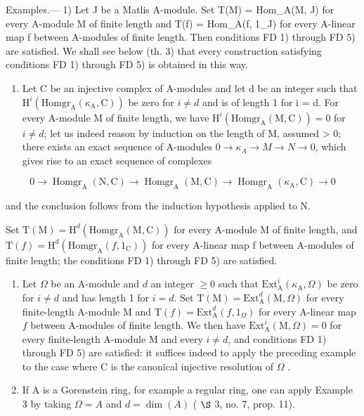 Examples.--- 1) Let J be a Matlis A-module. Set T(M) = Hom\_A(M, J) for every A-module M of finite length and T(f) = Hom\_A(f, 1\_J) for every A-linear map f between A-modules of finite length. Then conditions FD 1) through FD 5) are satisfied. We shall see below (th. 3) that every construction satisfying conditions FD 1) through FD 5) is obtained in this way.

\begin{enumerate}
\def\labelenumi{\arabic{enumi})}
\setcounter{enumi}{1}
\tightlist
\item
  Let C be an injective complex of A-modules and let d be an integer such that \(\mathrm{H}^{i}(\mathrm{Homgr}_{\mathrm{A}}(\kappa_{\mathrm{A}},\mathrm{C}))\) be zero for \(i \neq d\) and is of length 1 for i = d. For every A-module M of finite length, we have \(\mathrm{H}^{i}(\mathrm{Homgr}_{\mathrm{A}}(\mathrm{M},\mathrm{C})) = 0\) for \(i \neq d\); let us indeed reason by induction on the length of M, assumed \textgreater{} 0; there exists an exact sequence of A-modules \(0 \to \kappa_{A} \to M \to N \to 0\), which gives rise to an exact sequence of complexes
\end{enumerate}

\[
0 \rightarrow \operatorname{Homgr} _ {\mathrm{A}} (\mathrm{N}, \mathrm{C}) \longrightarrow \operatorname{Homgr} _ {\mathrm{A}} (\mathrm{M}, \mathrm{C}) \longrightarrow \operatorname{Homgr} _ {\mathrm{A}} (\kappa_ {\mathrm{A}}, \mathrm{C}) \longrightarrow 0
\]

and the conclusion follows from the induction hypothesis applied to N.

Set \(\mathrm{T}(\mathrm{M})=\mathrm{H}^{d}(\mathrm{Homgr}_{\mathrm{A}}(\mathrm{M},\mathrm{C}))\) for every A-module M of finite length, and \(\mathrm{T}(f)=\mathrm{H}^{d}(\mathrm{Homgr}_{\mathrm{A}}(f,1_{\mathrm{C}}))\) for every A-linear map f between A-modules of finite length; the conditions FD 1) through FD 5) are satisfied.

\begin{enumerate}
\def\labelenumi{\arabic{enumi})}
\setcounter{enumi}{2}
\item
  Let \(\Omega\) be an A-module and \(d\) an integer \(\geqslant 0\) such that \(\mathrm{Ext}_{\mathrm{A}}^{i}(\kappa_{\mathrm{A}},\Omega)\) be zero for \(i\neq d\) and has length 1 for \(i = d\). Set \(\mathrm{T(M)} = \mathrm{Ext}_{\mathrm{A}}^{d}(\mathrm{M},\Omega)\) for every finite-length A-module M and \(\mathrm{T}(f) = \mathrm{Ext}_{\mathrm{A}}^{d}(f,1_{\Omega})\) for every A-linear map \(f\) between A-modules of finite length. We then have \(\mathrm{Ext}_{\mathrm{A}}^{i}(\mathrm{M},\Omega) = 0\) for every finite-length A-module M and every \(i\neq d\), and conditions FD 1) through FD 5) are satisfied: it suffices indeed to apply the preceding example to the case where C is the canonical injective resolution of \(\Omega\) .
\item
  If A is a Gorenstein ring, for example a regular ring, one can apply Example 3 by taking \(\Omega = A\) and \(d = \dim(A)\) ( \(\S\) 3, no. 7, prop. 11).
\end{enumerate}

